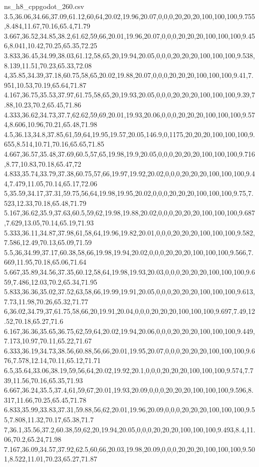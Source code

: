 \begin{filecontents*}[overwrite]{ns_h8_cppgodot_260.csv}
3.5,36.06,34.66,37.09,61.12,60,64,20.02,19.96,20.07,0,0,0,20,20,20,100,100,100,9.755,8.484,11.67,70.16,65.4,71.79
3.667,36.52,34.85,38.2,61.62,59,66,20.01,19.96,20.07,0,0,0,20,20,20,100,100,100,9.456,8.041,10.42,70.25,65.35,72.25
3.833,36.45,34.99,38.03,61.12,58,65,20,19.94,20.05,0,0,0,20,20,20,100,100,100,9.538,8.139,11.51,70.23,65.33,72.08
4,35.85,34.39,37.18,60.75,58,65,20.02,19.88,20.07,0,0,0,20,20,20,100,100,100,9.41,7.951,10.53,70.19,65.64,71.87
4.167,36.75,35.53,37.97,61.75,58,65,20,19.93,20.05,0,0,0,20,20,20,100,100,100,9.39,7.88,10.23,70.2,65.45,71.86
4.333,36.62,34.73,37.7,62.62,59,69,20.01,19.93,20.06,0,0,0,20,20,20,100,100,100,9.574,8.606,10.96,70.21,65.48,71.98
4.5,36.13,34.8,37.85,61,59,64,19.95,19.57,20.05,146.9,0,1175,20,20,20,100,100,100,9.655,8.514,10.71,70.16,65.65,71.85
4.667,36.57,35.48,37.69,60.5,57,65,19.98,19.9,20.05,0,0,0,20,20,20,100,100,100,9.716,8.77,10.83,70.18,65.47,72
4.833,35.74,33.79,37.38,60.75,57,66,19.97,19.92,20.02,0,0,0,20,20,20,100,100,100,9.44,7.479,11.05,70.14,65.17,72.06
5,35.59,34.17,37.31,59.75,56,64,19.98,19.95,20.02,0,0,0,20,20,20,100,100,100,9.75,7.523,12.33,70.18,65.48,71.79
5.167,36.62,35.9,37.63,60.5,59,62,19.98,19.88,20.02,0,0,0,20,20,20,100,100,100,9.687,7.629,13.05,70.14,65.19,71.93
5.333,36.11,34.87,37.98,61,58,64,19.96,19.82,20.01,0,0,0,20,20,20,100,100,100,9.582,7.586,12.49,70.13,65.09,71.59
5.5,36,34.99,37.17,60.38,58,66,19.98,19.94,20.02,0,0,0,20,20,20,100,100,100,9.566,7.669,11.95,70.18,65.06,71.64
5.667,35.89,34.56,37.35,60.12,58,64,19.98,19.93,20.03,0,0,0,20,20,20,100,100,100,9.659,7.486,12.03,70.2,65.34,71.95
5.833,36.36,35.02,37.52,63,58,66,19.99,19.91,20.05,0,0,0,20,20,20,100,100,100,9.613,7.73,11.98,70.26,65.32,71.77
6,36.02,34.79,37,61.75,58,66,20,19.91,20.04,0,0,0,20,20,20,100,100,100,9.697,7.49,12.52,70.18,65.27,71.6
6.167,36.36,35.65,36.75,62,59,64,20.02,19.94,20.06,0,0,0,20,20,20,100,100,100,9.449,7.173,10.97,70.11,65.22,71.67
6.333,36.19,34.73,38.56,60.88,56,66,20.01,19.95,20.07,0,0,0,20,20,20,100,100,100,9.676,7.578,12.14,70.11,65.12,71.71
6.5,35.64,33.06,38.19,59,56,64,20.02,19.92,20.1,0,0,0,20,20,20,100,100,100,9.574,7.739,11.56,70.16,65.35,71.93
6.667,36.24,35.5,37.4,61,59,67,20.01,19.93,20.09,0,0,0,20,20,20,100,100,100,9.596,8.317,11.66,70.25,65.45,71.78
6.833,35.99,33.83,37.31,59.88,56,62,20.01,19.96,20.09,0,0,0,20,20,20,100,100,100,9.55,7.808,11.32,70.17,65.38,71.7
7,36.1,35.56,37.2,60.38,59,62,20,19.94,20.05,0,0,0,20,20,20,100,100,100,9.493,8.4,11.06,70.2,65.24,71.98
7.167,36.09,34.57,37.92,62.5,60,66,20.03,19.98,20.09,0,0,0,20,20,20,100,100,100,9.501,8.522,11.01,70.23,65.27,71.87

\end{filecontents*}
